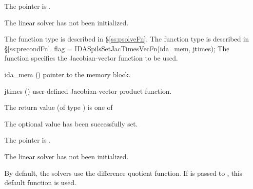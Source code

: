 {{\begin{args}
    The  pointer is .
  \item[\Id{IDASPILS\_LMEM\_NULL}]
    The {\idaspils} linear solver has not been initialized.
  \end{args}
}
{
   The function type  is described in \S\ref{ss:psolveFn}.
   The function type  is described in \S\ref{ss:precondFn}.
}
{
  flag = IDASpilsSetJacTimesVecFn(ida\_mem, jtimes);
}
{
  The function  specifies the Jacobian-vector 
  function to be used.
}
{
  \begin{args}
  \item[ida\_mem] ()
    pointer to the {\ida} memory block.
  \item[jtimes] ()
    user-defined Jacobian-vector product function.
  \end{args}
}
{
  The return value  (of type ) is one of
  \begin{args}
  \item[\Id{IDASPILS\_SUCCESS}] 
    The optional value has been successfully set.
  \item[\Id{IDASPILS\_MEM\_NULL}]
    The  pointer is .
  \item[\Id{IDASPILS\_LMEM\_NULL}]
    The {\idaspils} linear solver has not been initialized.
  \end{args}
}
{
  By default, the {\idaspils} solvers use the difference quotient function. 
  If  is passed to , this default function is used.

}}
